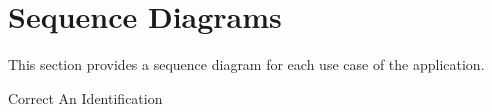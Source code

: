 \documentclass[]{article}
\begin{document}
\section{Sequence Diagrams}
\label{sec:sequence_diagrams}
This section provides a sequence diagram for each use case of the application.
\\
\begin{center}
	Correct An Identification

\end{center}
\end{document}
